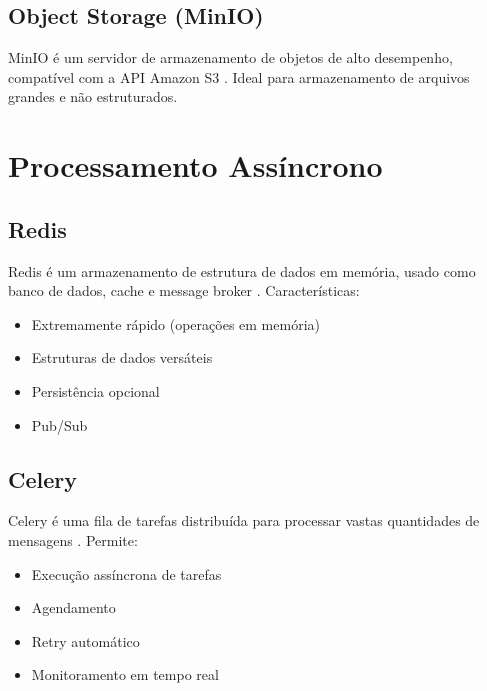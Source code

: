 \subsection{Object Storage (MinIO)}

MinIO é um servidor de armazenamento de objetos de alto desempenho, compatível com a API Amazon S3 \cite{minio2021}. Ideal para armazenamento de arquivos grandes e não estruturados.

\section{Processamento Assíncrono}

\subsection{Redis}

Redis é um armazenamento de estrutura de dados em memória, usado como banco de dados, cache e message broker \cite{redis2021}. Características:

\begin{itemize}
    \item Extremamente rápido (operações em memória)
    \item Estruturas de dados versáteis
    \item Persistência opcional
    \item Pub/Sub
\end{itemize}

\subsection{Celery}

Celery é uma fila de tarefas distribuída para processar vastas quantidades de mensagens \cite{celery2021}. Permite:

\begin{itemize}
    \item Execução assíncrona de tarefas
    \item Agendamento
    \item Retry automático
    \item Monitoramento em tempo real
\end{itemize}

